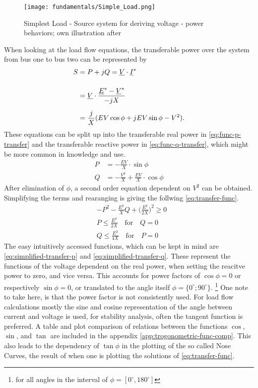 \begin{figure}[htbp!]
    \centering
    \texttt{[image: fundamentals/Simple\_Load.png]}
    \caption[Simplest Load - Source system for deriving voltage - power behaviors]{Simplest Load - Source system for deriving voltage - power behaviors; own illustration after \autocite{machowski_2020,kundur_2022,milano_2010}}
    \label{fig:v-stability-system}
\end{figure}

When looking at the load flow equations, the transferable power over the system from bus one to bus two can be represented by
\begin{align}
    S&=P + jQ = \underline{V} \cdot \underline{I}^* \notag \\[12pt]
    &=\underline{V} \cdot \frac{\underline{E}^* - \underline{V}^*}{-jX} \notag \\[6pt]
    &=\frac{j}{X} (EV \cos \phi + jEV \sin \phi -V^2). \notag
\end{align}
These equations can be split up into the transferable real power in \autoref{eq:func-p-transfer} and the transferable reactive power in \autoref{eq:func-q-transfer}, which might be more common in knowledge and use.
\begin{align}
    P&=-\frac{EV}{X} \cdot \sin \phi \label{eq:func-p-transfer} \\[6pt]
    Q&=-\frac{V^2}{X} + \frac{EV}{X} \cdot \cos \phi \label{eq:func-q-transfer}
\end{align}
After elimination of $\phi$, a second order equation dependent on $V^2$ can be obtained.
Simplifying the terms and rearanging is giving the follwing \autoref{eq:transfer-func}.
\begin{align}
    &-P^2 - \frac{E^2}{X}Q + \bigg(\frac{E^2}{2X}\bigg)^2 \geq 0 \label{eq:transfer-func} \\[12pt]
    &P \leq \frac{E^2}{2X} \quad\text{for}\quad Q=0 \label{eq:simplified-transfer-p} \\[6pt]
    &Q \leq \frac{E^2}{4X} \quad\text{for}\quad P=0 \label{eq:simplified-transfer-q}
\end{align}
The easy intuitively accessed functions, which can be kept in mind are \autoref{eq:simplified-transfer-p} and \autoref{eq:simplified-transfer-q}.
These represent the functions of the voltage dependent on the real power, when setting the reacitve power to zero, and vice versa. 
This accounts for power factors of $\cos \phi = 0$ or respectively $\sin \phi = 0$, or translated to the angle itself $\phi = \{0^\circ; 90^\circ\}$.
\footnote{for all angles in the interval of $\phi = [0^\circ, 180^\circ]$}
One note to take here, is that the power factor is not consistently used.
For load flow calculations mostly the sine and cosine representation of the angle between current and voltage is used, for stability analysis, often the tangent function is preferred.
A table and plot comparison of relations between the functions $\cos$, $\sin$, and $\tan$ are included in the appendix \autoref{app:trogonometric-func-comp}. 
This also leads to the dependency of $\tan \phi$ in the plotting of the so called Nose Curves, the result of when one is plotting the solutions of \autoref{eq:transfer-func}.

